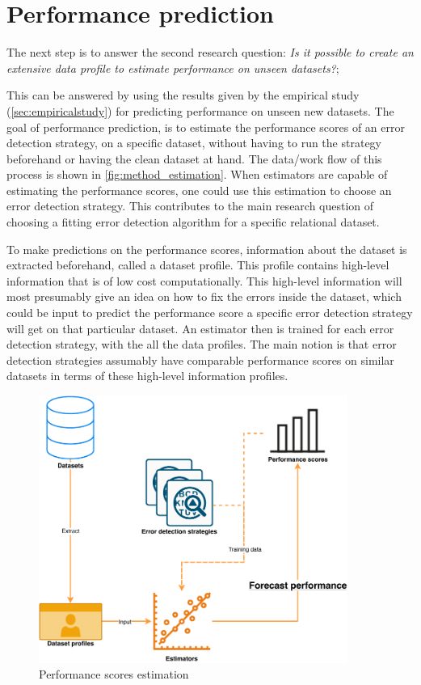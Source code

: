 \newpage
\section{Performance prediction}
\label{sec:performanceprediction}
The next step is to answer the second research question: \textit{Is it possible to create an extensive data profile to estimate performance on unseen datasets?}; 

This can be answered by using the results given by the empirical study (\autoref{sec:empiricalstudy}) for predicting performance on unseen new datasets. The goal of performance prediction, is to estimate the performance scores of an error detection strategy, on a specific dataset, without having to run the strategy beforehand or having the clean dataset at hand. The data/work flow of this process is shown in \autoref{fig:method_estimation}.
When estimators are capable of estimating the performance scores, one could use this estimation to choose an error detection strategy. This contributes to the main research question of choosing a fitting error detection algorithm for a specific relational dataset.

To make predictions on the performance scores, information about the dataset is extracted beforehand, called a dataset profile. This profile contains high-level information that is of low cost computationally. This high-level information will most presumably give an idea on how to fix the errors inside the dataset, which could be input to predict the performance score a specific error detection strategy will get on that particular dataset. An estimator then is trained for each error detection strategy, with the all the data profiles. The main notion is that error detection strategies assumably have comparable performance scores on similar datasets in terms of these high-level information profiles. 

\begin{figure}[h]
	\centering
	\includegraphics[width=0.9\textwidth]{thesis/Figures/Method/PerformanceEstimation-Profiler.pdf}
	\caption{Performance scores estimation}
	\label{fig:method_estimation}
\end{figure}

